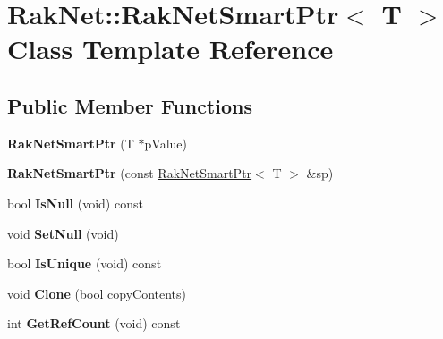 \hypertarget{class_rak_net_1_1_rak_net_smart_ptr}{\section{Rak\-Net\-:\-:Rak\-Net\-Smart\-Ptr$<$ T $>$ Class Template Reference}
\label{class_rak_net_1_1_rak_net_smart_ptr}
}
\subsection*{Public Member Functions}
\begin{DoxyCompactItemize}
\item 
\hypertarget{class_rak_net_1_1_rak_net_smart_ptr_a2b2cad0f0ba040e3e00e2e61ca493bbc}{{\bfseries Rak\-Net\-Smart\-Ptr} (T $\ast$p\-Value)}\label{class_rak_net_1_1_rak_net_smart_ptr_a2b2cad0f0ba040e3e00e2e61ca493bbc}

\item 
\hypertarget{class_rak_net_1_1_rak_net_smart_ptr_a06beb2cab711c9f7c9ef69a5889b2b03}{{\bfseries Rak\-Net\-Smart\-Ptr} (const \hyperlink{class_rak_net_1_1_rak_net_smart_ptr}{Rak\-Net\-Smart\-Ptr}$<$ T $>$ \&sp)}\label{class_rak_net_1_1_rak_net_smart_ptr_a06beb2cab711c9f7c9ef69a5889b2b03}

\item 
\hypertarget{class_rak_net_1_1_rak_net_smart_ptr_ac796beb5d10bc14ae0823e116283f6ea}{bool {\bfseries Is\-Null} (void) const }\label{class_rak_net_1_1_rak_net_smart_ptr_ac796beb5d10bc14ae0823e116283f6ea}

\item 
\hypertarget{class_rak_net_1_1_rak_net_smart_ptr_ab672131fef737bd528dedd8d510700e4}{void {\bfseries Set\-Null} (void)}\label{class_rak_net_1_1_rak_net_smart_ptr_ab672131fef737bd528dedd8d510700e4}

\item 
\hypertarget{class_rak_net_1_1_rak_net_smart_ptr_a01053bdce1d1d8f0f36c962fe3cd8d16}{bool {\bfseries Is\-Unique} (void) const }\label{class_rak_net_1_1_rak_net_smart_ptr_a01053bdce1d1d8f0f36c962fe3cd8d16}

\item 
\hypertarget{class_rak_net_1_1_rak_net_smart_ptr_ae09e56ccb67072ee9b28c0f4a9bdf72e}{void {\bfseries Clone} (bool copy\-Contents)}\label{class_rak_net_1_1_rak_net_smart_ptr_ae09e56ccb67072ee9b28c0f4a9bdf72e}

\item 
\hypertarget{class_rak_net_1_1_rak_net_smart_ptr_ad831902b3b5eec6095e94cea1c7c8dbf}{int {\bfseries Get\-Ref\-Count} (void) const }\label{class_rak_net_1_1_rak_net_smart_ptr_ad831902b3b5eec6095e94cea1c7c8dbf}


\end{DoxyCompactItemize}
